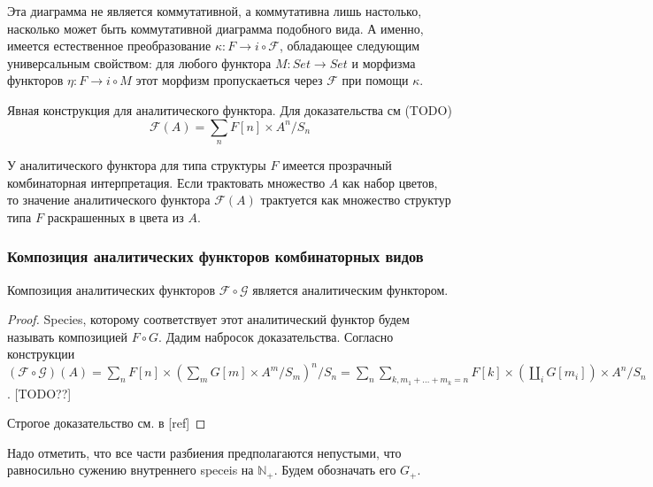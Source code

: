 Эта диаграмма не является коммутативной, а коммутативна лишь настолько, насколько может быть коммутативной диаграмма
подобного вида. А именно, имеется  естественное преобразование  $\kappa \colon
F \rightarrow i \circ \mathcal F$, обладающее следующим универсальным свойством:
 для любого функтора $M \colon
Set \rightarrow Set$ и морфизма функторов $\eta \colon F \rightarrow i \circ M$
этот морфизм пропускаеться через $\mathcal F$ при помощи $\kappa$.



Явная конструкция для аналитического функтора. Для доказательства см (TODO)
\begin{equation}
\label{eq:an}
	\mathcal F(A) = \sum\limits_n F[n] \times A^n / S_n
\end{equation}

У аналитического функтора для типа структуры $F$ имеется прозрачный комбинаторная интерпретация.
Если трактовать множество $A$ как набор цветов,
то значение аналитического функтора $\mathcal F(A)$ трактуется как множество структур типа $F$
раскрашенных в цвета из $A$.

\subsubsection{Композиция аналитических функторов комбинаторных видов}
\begin{theorem}
Композиция аналитических функторов $\mathcal F \circ \mathcal G$ является
аналитическим функтором.
\end{theorem}
\begin{proof}
Species, которому соответствует этот аналитический функтор будем называть
композицией $F \circ G$.
Дадим набросок доказательства. Согласно конструкции $(\mathcal F \circ \mathcal
G) (A) = \sum\limits_n F[n] \times (\sum\limits_m G[m] \times A^m / S_m)^n /
S_n = \sum\limits_n \sum\limits_{k, m_1 + \dots + m_k = n} F[k] \times
(\coprod\limits_{i} G[m_i]) \times A^n / S_n$. [TODO??]

Строгое доказательство см. в [ref]
\end{proof}
Надо отметить, что все части разбиения предполагаются непустыми, что равносильно
сужению внутреннего speceis на $\mathbb N_{+}$. Будем обозначать его $G_{+}$.

